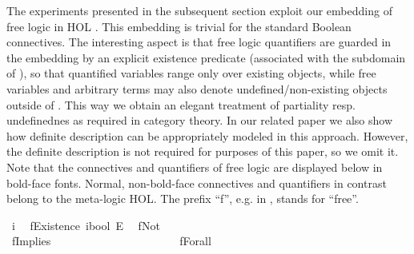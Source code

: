 \begin{isabellebody}
\begin{isamarkuptext}
The experiments presented in the subsequent section exploit our embedding of free logic 
in HOL \cite{C57}. This embedding is trivial for the standard Boolean connectives. The interesting
aspect is that free logic quantifiers are guarded in the embedding by an explicit existence 
predicate  (associated with the subdomain  of ), so 
that quantified variables range only over existing objects, while free 
variables and arbitrary terms may also denote undefined/non-existing objects outside of . 
This way we obtain an 
elegant treatment of partiality resp. undefinednes as required in category theory. In our related 
paper \cite{C57} we also show how definite description can be appropriately modeled in this
approach. However, the definite description is not required for purposes of this paper, so we omit it.
Note that the connectives and quantifiers of free logic are displayed below in bold-face fonts. Normal, 
non-bold-face connectives and quantifiers in contrast belong to the meta-logic HOL. The prefix ``f'',
e.g. in , stands for ``free''.%
\end{isamarkuptext}\isamarkuptrue%
\isamarkupfalse%
\ i\ %
\isanewline
{}\isamarkupfalse%
\ fExistence{\isacharcolon}{\isacharcolon}\ {\isachardoublequoteopen}i{\isasymRightarrow}bool{\isachardoublequoteclose}\ {\isacharparenleft}{\isachardoublequoteopen}E{\isachardoublequoteclose}{\isacharparenright}\ %
\isanewline
\isanewline
{}\isamarkupfalse%
\ fNot\ {\isacharparenleft}{\isachardoublequoteopen}\isactrlbold {\isasymnot}{\isachardoublequoteclose}{\isacharparenright}\ %
\ \ \ \ \ \ \ \ \ \ \ \ \ \ \ \ \ \ \ \ \ \ \ \ \ \ \isanewline
\ \ {\isachardoublequoteopen}\isactrlbold {\isasymnot}{\isasymphi}\ {\isasymequiv}\ {\isasymnot}{\isasymphi}{\isachardoublequoteclose}\ \ \ \ \ \isanewline
{}\isamarkupfalse%
\ fImplies\ {\isacharparenleft}\ {\isachardoublequoteopen}\isactrlbold {\isasymrightarrow}{\isachardoublequoteclose}\ {}{}{\isacharparenright}\ %
\ \ \ \ \ \ \ \ \isanewline
\ \ {\isachardoublequoteopen}{\isasymphi}\ \isactrlbold {\isasymrightarrow}\ {\isasympsi}\ {\isasymequiv}\ {\isasymphi}\ {\isasymlongrightarrow}\ {\isasympsi}{\isachardoublequoteclose}\isanewline
{}\isamarkupfalse%
\ fForall\ {\isacharparenleft}{\isachardoublequoteopen}\isactrlbold {\isasymforall}{\isachardoublequoteclose}{\isacharparenright}\ %

\end{isabellebody}
